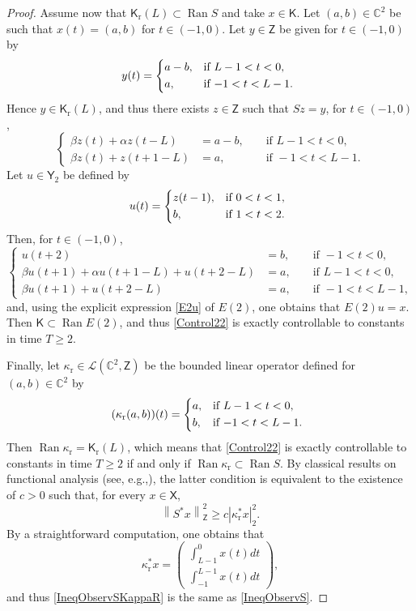 \documentclass[JEP,XML,SOM,Unicode]{cedram}
\renewcommand{\eg}{e.g.,\xspace}
\theoremstyle{plain}
\theoremstyle{definition}
\DeclareMathOperator{\range}{Ran}
\newcommand{\norm}[1]{\left\lVert #1\right\lVert}
\newcommand{\abs}[1]{\left\lvert #1\right \rvert}
\begin{document}
\begin{proof}
Assume now that $\mathsf K_{\mathrm r}(L) \subset \range S$ and take $x \in \mathsf K$. Let $(a, b) \in \mathbb C^2$ be such that $x(t) = (a, b)$ for $t \in (-1, 0)$. Let $y \in \mathsf Z$ be given for $t \in (-1, 0)$ by
\[
y(t) = \begin{dcases*}
a - b, & if $L - 1 < t < 0$, \\
a, & if $-1 < t < L - 1$.
\end{dcases*}
\]
Hence $y \in \mathsf K_{\mathrm r}(L)$, and thus there exists $z \in \mathsf Z$ such that $S z = y$, \ie for $t \in (-1, 0)$,
\[
\left\{
\begin{aligned}
\beta z(t) + \alpha z(t - L) & = a - b, & & \text{ if } L - 1 < t < 0, \\
\beta z(t) + z(t + 1 - L) & = a, & & \text{ if } -1 < t < L - 1.
\end{aligned}
\right.
\]
Let $u \in \mathsf Y_2$ be defined by
\[
u(t) =
\begin{dcases*}
z(t - 1), & if $0 < t < 1$, \\
b, & if $1 < t < 2$.
\end{dcases*}
\]
Then, for $t \in (-1, 0)$,
\[
\left\{
\begin{aligned}
u(t + 2) & = b, & & \text{ if } -1 < t < 0, \\
\beta u(t + 1) + \alpha u(t + 1 - L) + u(t + 2 - L) & = a, & & \text{ if } L - 1 < t < 0, \\
\beta u(t + 1) + u(t + 2 - L) & = a, & & \text{ if } -1 < t < L - 1,
\end{aligned}
\right.
\]
and, using the explicit expression \eqref{E2u} of $E(2)$, one obtains that $E(2) u = x$. Then $\mathsf K \subset \range E(2)$, and thus \eqref{Control22} is exactly controllable to constants in time $T \geq 2$.

Finally, let $\kappa_{\mathrm r} \in \mathcal L(\mathbb C^2, \mathsf Z)$ be the bounded linear operator defined for $(a, b) \in \mathbb C^2$ by
\[
(\kappa_{\mathrm r} (a, b)) (t) =
\begin{dcases*}
a, & if $L - 1 < t < 0$, \\
b, & if $-1 < t < L - 1$.
\end{dcases*}
\]
Then $\range \kappa_{\mathrm r} = \mathsf K_{\mathrm r}(L)$, which means that \eqref{Control22} is exactly controllable to constants in time $T \geq 2$ if and only if $\range \kappa_{\mathrm r} \subset \range S$. By classical results on functional analysis (see, \eg \cite[Lem.\,2.48]{Coron2007Control}), the latter condition is equivalent to the existence of $c > 0$ such that, for every $x \in \mathsf X$,
\begin{equation}
\label{IneqObservSKappaR}
\norm{S^\ast x}_{\mathsf Z}^2 \geq c \abs{\kappa_{\mathrm r}^\ast x}_2^2.
\end{equation}
By a straightforward computation, one obtains that
\[
\kappa_{\mathrm r}^\ast x =
\left(
\begin{aligned}
\textstyle\int_{L-1}^0 x(t) dt \\
\textstyle\int_{-1}^{L-1} x(t) dt
\end{aligned}
\right),
\]
and thus \eqref{IneqObservSKappaR} is the same as \eqref{IneqObservS}.
\end{proof}
\end{document}

